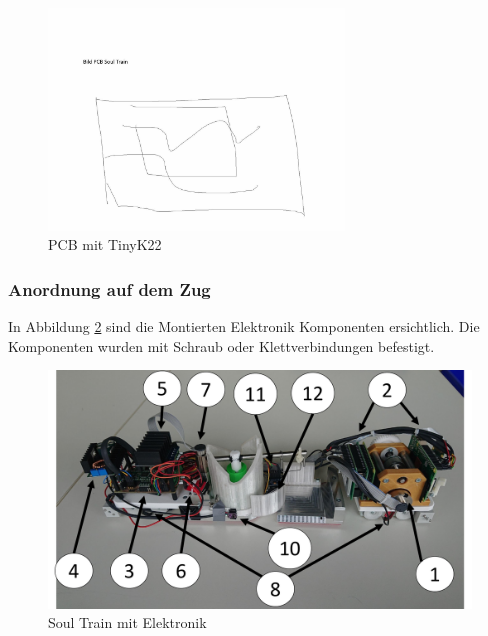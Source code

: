 \documentclass[../../main.tex]{subfiles}
\begin{document}
    \begin{figure}[H]
        \centering
        \includegraphics[width=0.7\textwidth]{../../images/et/et_pcb.jpg}
        \caption {PCB mit TinyK22}
        \label{fig:et_pcb}
    \end{figure}

    \subsubsection{Anordnung auf dem Zug} \label{et_anordnung}
    In Abbildung \ref{fig:et_anordnung} sind die Montierten Elektronik Komponenten ersichtlich. Die Komponenten wurden mit Schraub oder Klettverbindungen befestigt.\\

    \begin{figure}[H]
        \centering
        \includegraphics[width=1.0\textwidth]{../../images/et/et_anordnung_zug.pdf}
        \caption {Soul Train mit Elektronik}
        \label{fig:et_anordnung}
    \end{figure}
\end{document}
